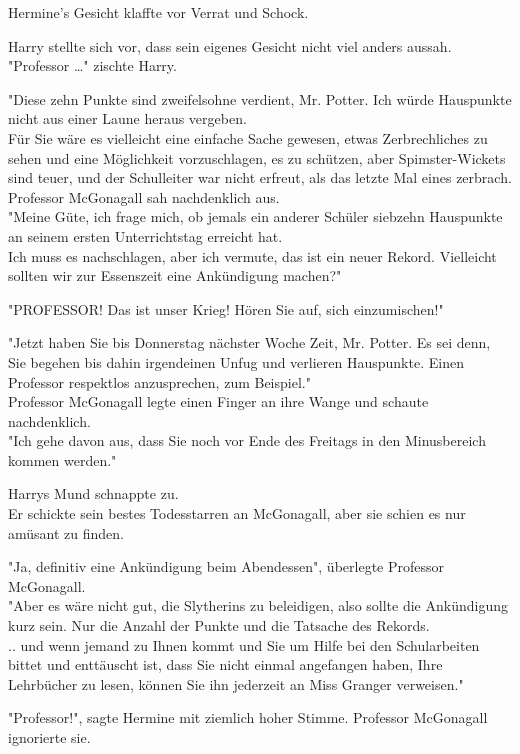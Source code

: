 {Hermine's Gesicht klaffte vor Verrat und Schock.

Harry stellte sich vor, dass sein eigenes Gesicht nicht viel anders aussah.\\ "Professor …" zischte Harry.

"Diese zehn Punkte sind zweifelsohne verdient, Mr. Potter. Ich würde Hauspunkte nicht aus einer Laune heraus vergeben.\\ Für Sie wäre es vielleicht eine einfache Sache gewesen, etwas Zerbrechliches zu sehen und eine Möglichkeit vorzuschlagen, es zu schützen, aber Spimster-Wickets sind teuer, und der Schulleiter war nicht erfreut, als das letzte Mal eines zerbrach. Professor McGonagall sah nachdenklich aus.\\ "Meine Güte, ich frage mich, ob jemals ein anderer Schüler siebzehn Hauspunkte an seinem ersten Unterrichtstag erreicht hat.\\ Ich muss es nachschlagen, aber ich vermute, das ist ein neuer Rekord. Vielleicht sollten wir zur Essenszeit eine Ankündigung machen?"

"PROFESSOR! Das ist unser Krieg! Hören Sie auf, sich einzumischen!"

"Jetzt haben Sie bis Donnerstag nächster Woche Zeit, Mr. Potter. Es sei denn, Sie begehen bis dahin irgendeinen Unfug und verlieren Hauspunkte. Einen Professor respektlos anzusprechen, zum Beispiel."\\ Professor McGonagall legte einen Finger an ihre Wange und schaute nachdenklich.\\ "Ich gehe davon aus, dass Sie noch vor Ende des Freitags in den Minusbereich kommen werden."

Harrys Mund schnappte zu.\\ Er schickte sein bestes Todesstarren an McGonagall, aber sie schien es nur amüsant zu finden.

"Ja, definitiv eine Ankündigung beim Abendessen", überlegte Professor McGonagall.\\ "Aber es wäre nicht gut, die Slytherins zu beleidigen, also sollte die Ankündigung kurz sein. Nur die Anzahl der Punkte und die Tatsache des Rekords.\\ .. und wenn jemand zu Ihnen kommt und Sie um Hilfe bei den Schularbeiten bittet und enttäuscht ist, dass Sie nicht einmal angefangen haben, Ihre Lehrbücher zu lesen, können Sie ihn jederzeit an Miss Granger verweisen."

"Professor!", sagte Hermine mit ziemlich hoher Stimme. Professor McGonagall ignorierte sie.

}
